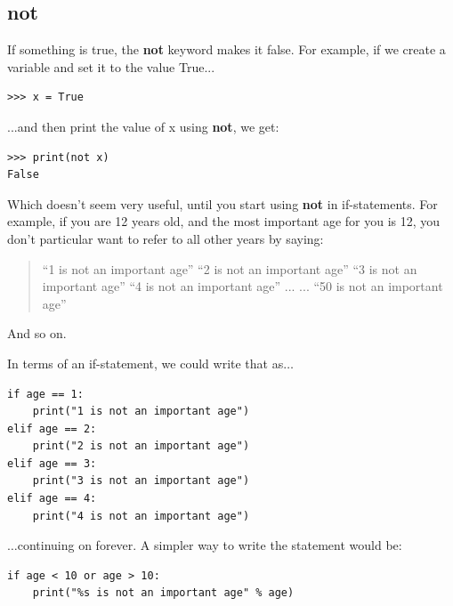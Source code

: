 \subsection*{not}

If something is true, the \textbf{not} keyword makes it false.  For example, if we create a variable  and set it to the value True...

\begin{listing}
\begin{verbatim}
>>> x = True
\end{verbatim}
\end{listing}

...and then print the value of x using \textbf{not}, we get:

\begin{listing}
\begin{verbatim}
>>> print(not x)
False
\end{verbatim}
\end{listing}

Which doesn't seem very useful, until you start using \textbf{not} in if-statements.  For example, if you are 12 years old, and the most important age for you is 12, you don't particular want to refer to all other years by saying:

\begin{quotation}
``1 is not an important age''
``2 is not an important age''
``3 is not an important age''
``4 is not an important age''
...
...
``50 is not an important age''
\end{quotation}

And so on.
\par\noindent
In terms of an if-statement, we could write that as$\ldots$

\begin{listing}
\begin{verbatim}
if age == 1:
    print("1 is not an important age")
elif age == 2:
    print("2 is not an important age")
elif age == 3:
    print("3 is not an important age")
elif age == 4:
    print("4 is not an important age")
\end{verbatim}
\end{listing}

\noindent
$\ldots$continuing on forever. A simpler way to write the statement would be:

\begin{listing}
\begin{verbatim}
if age < 10 or age > 10:
    print("%s is not an important age" % age)
\end{verbatim}
\end{listing}

